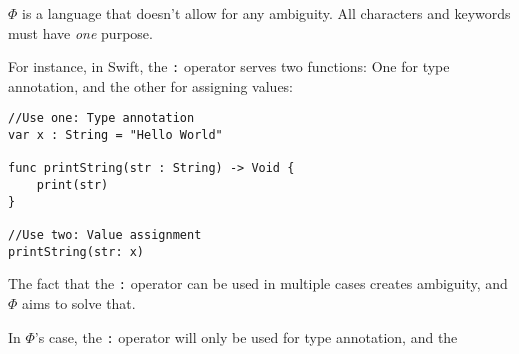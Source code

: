 \documentclass[../../main.tex]{subfiles}
\begin{document}
$\Phi$ is a language that doesn't allow for any ambiguity. All characters and keywords must have \textit{one} purpose.

For instance, in Swift, the \texttt{:} operator serves two functions: One for type annotation, and the other for assigning values:

\begin{verbatim}
//Use one: Type annotation
var x : String = "Hello World"

func printString(str : String) -> Void {
    print(str)
}

//Use two: Value assignment
printString(str: x)
\end{verbatim}

The fact that the \texttt{:} operator can be used in multiple cases creates ambiguity, and $\Phi$ aims to solve that.

In $\Phi$'s case, the \texttt{:} operator will only be used for type annotation, and the 
\end{document}
